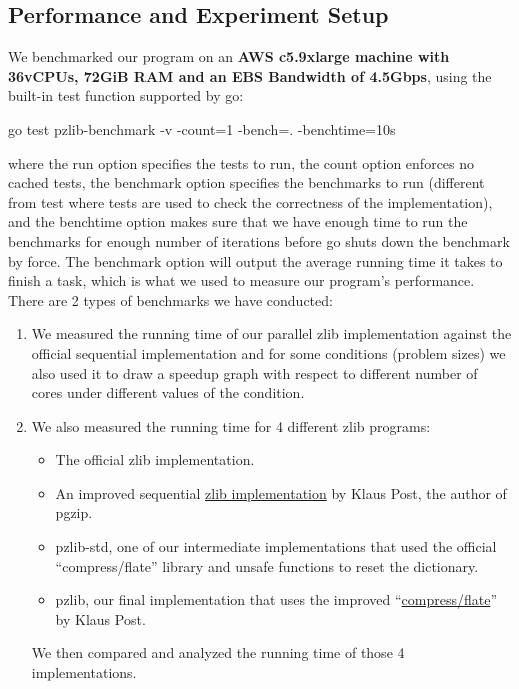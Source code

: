 \documentclass[12pt]{article}
\begin{document}
    \subsection{Performance and Experiment Setup}
    We benchmarked our program on an \textbf{AWS c5.9xlarge machine with 36vCPUs, 72GiB RAM and an EBS Bandwidth of 4.5Gbps}, using the built-in test function supported by go:\\
    \begin{center} go test pzlib-benchmark -v -count=1 -bench=. -benchtime=10s\end{center}
    where the run option specifies the tests to run, the count option enforces no cached tests, the benchmark option specifies the benchmarks to run (different from test where tests are used to check the correctness of the implementation), and the benchtime option makes sure that we have enough time to run the benchmarks for enough number of iterations before go shuts down the benchmark by force. The benchmark option will output the average running time it takes to finish a task, which is what we used to measure our program's performance.\\
    There are 2 types of benchmarks we have conducted:
    \begin{enumerate}
        \item We measured the running time of our parallel zlib implementation against the official sequential implementation and for some conditions (problem sizes) we also used it to draw a speedup graph with respect to different number of cores under different values of the condition.
        \item We also measured the running time for 4 different zlib programs:
        \begin{itemize}
            \item The official zlib implementation.
            \item An improved sequential \href{https://github.com/klauspost/compress/tree/master/zlib}{zlib implementation} by Klaus Post, the author of pgzip.
            \item pzlib-std, one of our intermediate implementations that used the official ``compress/flate'' library and unsafe functions to reset the dictionary.
            \item pzlib, our final implementation that uses the improved ``\href{https://github.com/klauspost/compress/tree/master/flate}{compress/flate}'' by Klaus Post.
        \end{itemize}
        We then compared and analyzed the running time of those 4 implementations.
    \end{enumerate}
\end{document}
